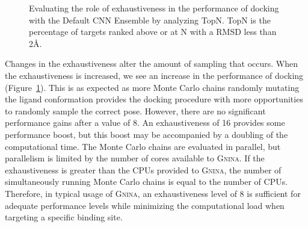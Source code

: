 \documentclass[linenumbers,doublespacing]{bmcart}
\begin{document}
\begin{figure}[tbh]  
	\caption{Evaluating the role of exhaustiveness in the performance of docking with the Default CNN Ensemble by analyzing TopN. TopN is the percentage of targets ranked above or at N with a RMSD less than 2{\AA}.}
	\label{fig:exhaustiveness}
\end{figure}    

Changes in the exhaustiveness alter the amount of sampling that occurs. When the exhaustiveness is increased, we see an increase in the performance of docking (Figure~\ref{fig:exhaustiveness}). This is as expected as more Monte Carlo chains randomly mutating the ligand conformation provides the docking procedure with more opportunities to randomly sample the correct pose. However, there are no significant performance gains after a value of 8. An exhaustiveness of 16 provides some performance boost, but this boost may be accompanied by a doubling of the computational time. The Monte Carlo chains are evaluated in parallel, but parallelism is limited by the number of cores available to \textsc{Gnina}. If the exhaustiveness is greater than the CPUs provided to \textsc{Gnina}, the number of simultaneously running Monte Carlo chains is equal to the number of CPUs. Therefore, in typical usage of \textsc{Gnina}, an exhaustiveness level of 8 is sufficient for adequate performance levels while minimizing the computational load when targeting a specific binding site. 
\end{document}
